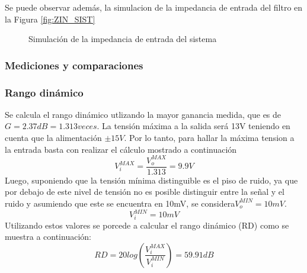 Se puede observar adem\'as, la simulacion de la impedancia de entrada del filtro en la Figura \ref{fig:ZIN_SIST}
\begin{figure}[H]
    \centering
    \caption{Simulaci\'on de la impedancia de entrada del sistema}
    \label{fig:VERIFY}
\end{figure}

\subsubsection{Mediciones y comparaciones}
\subsubsection{Rango din\'amico}
Se calcula el rango din\'amico utlizando la mayor ganancia medida, que es de $G=2.37dB = 1.313 veces$. La tensi\'on m\'axima a la salida ser\'a 13V teniendo en cuenta que la alimentaci\'on $\pm 15V$. Por lo tanto, para hallar la m\'axima tension a la entrada basta con realizar el c\'alculo mostrado a continuaci\'on
\begin{equation}
    V_i^{MAX} = \frac{V_o^{MAX}}{1.313} = 9.9V
\end{equation}
\newline\noindent
Luego, suponiendo que la  tensi\'on m\'inima distinguible es el piso de ruido, ya que por debajo de este nivel de tensi\'on no es posible distinguir entre la se\~nal y el ruido y asumiendo que este se encuentra en 10mV, se considera$V_o^{MIN}=10mV$.
\begin{equation}
    V_i^{MIN} = 10mV
\end{equation}
\newline\noindent
Utilizando estos valores se porcede a calcular el rango din\'amico (RD) como se muestra a continuaci\'on:
\begin{equation}
    RD = 20log(\frac{V_i^{MAX}}{V_i^{MIN}})= 59.91dB
\end{equation}

